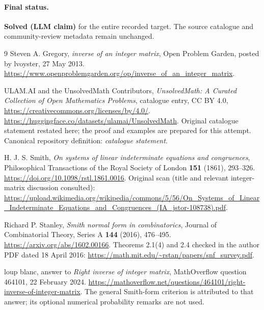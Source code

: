 \documentclass[11pt]{article}
\begin{document}
\paragraph{Final status.}
\textbf{Solved (LLM claim)} for the entire recorded target. The source
catalogue and community-review metadata remain unchanged.

\begin{thebibliography}{9}
Steven A. Gregory, \emph{inverse of an integer matrix},
Open Problem Garden, posted by lvoyster, 27 May 2013.
\url{https://www.openproblemgarden.org/op/inverse_of_an_integer_matrix}.

ULAM.AI and the UnsolvedMath Contributors,
\emph{UnsolvedMath: A Curated Collection of Open Mathematics Problems},
catalogue entry, CC BY 4.0,
\url{https://creativecommons.org/licenses/by/4.0/}.
\url{https://huggingface.co/datasets/ulamai/UnsolvedMath}.
Original catalogue statement restated here; the proof and examples are
prepared for this attempt. Canonical repository definition:
\textit{catalogue statement}.

H. J. S. Smith, \emph{On systems of linear indeterminate equations and
congruences}, Philosophical Transactions of the Royal Society of
London \textbf{151} (1861), 293--326.
\url{https://doi.org/10.1098/rstl.1861.0016}.
Original scan (title and relevant integer-matrix discussion consulted):
\url{https://upload.wikimedia.org/wikipedia/commons/5/56/On_Systems_of_Linear_Indeterminate_Equations_and_Congruences_(IA_jstor-108738).pdf}.

Richard P. Stanley, \emph{Smith normal form in combinatorics},
Journal of Combinatorial Theory, Series A \textbf{144} (2016), 476--495.
\url{https://arxiv.org/abs/1602.00166}.
Theorems 2.1(4) and 2.4 checked in the author PDF dated 18 April 2016:
\url{https://math.mit.edu/~rstan/papers/snf_survey.pdf}.

loup blanc, answer to \emph{Right inverse of integer matrix},
MathOverflow question 464101, 22 February 2024.
\url{https://mathoverflow.net/questions/464101/right-inverse-of-integer-matrix}.
The general Smith-form criterion is attributed to that answer;
its optional numerical probability remarks are not used.
\end{thebibliography}
\end{document}
